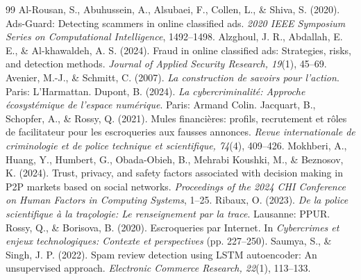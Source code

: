 \documentclass[11pt,a4paper]{article}
\begin{document}
{\newpage}

\begin{thebibliography}{99}
 Al-Rousan, S., Abuhussein, A., Alsubaei, F., Collen, L., \& Shiva, S. (2020). Ads-Guard: Detecting scammers in online classified ads. \emph{2020 IEEE Symposium Series on Computational Intelligence}, 1492--1498.
 Alzghoul, J. R., Abdallah, E. E., \& Al-khawaldeh, A. S. (2024). Fraud in online classified ads: Strategies, risks, and detection methods. \emph{Journal of Applied Security Research, 19}(1), 45--69.
 Avenier, M.-J., \& Schmitt, C. (2007). \emph{La construction de savoirs pour l'action}. Paris: L'Harmattan.
 Dupont, B. (2024). \emph{La cybercriminalité: Approche écosystémique de l'espace numérique}. Paris: Armand Colin.
 Jacquart, B., Schopfer, A., \& Rossy, Q. (2021). Mules financières: profils, recrutement et rôles de facilitateur pour les escroqueries aux fausses annonces. \emph{Revue internationale de criminologie et de police technique et scientifique, 74}(4), 409--426.
 Mokhberi, A., Huang, Y., Humbert, G., Obada-Obieh, B., Mehrabi Koushki, M., \& Beznosov, K. (2024). Trust, privacy, and safety factors associated with decision making in P2P markets based on social networks. \emph{Proceedings of the 2024 CHI Conference on Human Factors in Computing Systems}, 1--25.
 Ribaux, O. (2023). \emph{De la police scientifique à la traçologie: Le renseignement par la trace}. Lausanne: PPUR.
 Rossy, Q., \& Borisova, B. (2020). Escroqueries par Internet. In \emph{Cybercrimes et enjeux technologiques: Contexte et perspectives} (pp. 227--250).
 Saumya, S., \& Singh, J. P. (2022). Spam review detection using LSTM autoencoder: An unsupervised approach. \emph{Electronic Commerce Research, 22}(1), 113--133.
\end{thebibliography}
\end{document}

